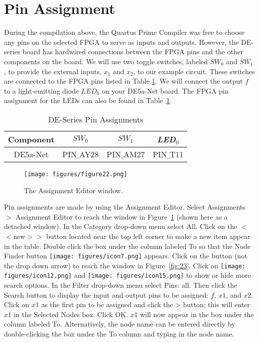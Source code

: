 \section{Pin Assignment}


During the compilation above, the Quartus Prime Compiler was free to choose any
pins on the selected FPGA to serve as inputs and outputs. However, the DE-series board
has hardwired connections between the FPGA pins and the other components on the board.
We will use two toggle switches, labeled $SW_0$ and $SW_1$, to provide the
external inputs, $x_1$ and $x_2$, to our example circuit. These switches are connected
to the FPGA pins listed in Table \ref{tab:pinassign}. We will connect the output $f$ to a
light-emitting diode $LED_0$ on your DE5a-Net board. 
The FPGA pin assignment for the LEDs can also be found in Table~\ref{tab:pinassign}.

\begin{table}[H]
\centering
\begin{tabular}{| c | c | c | c |}
\hline
Component & $SW_0$ & $SW_1$ & {\it LED}$_0$ \\
\hline
DE5a-Net & PIN$\_$AY28 & PIN$\_$AM27 & PIN$\_$T11 \\
\hline
\end{tabular}
 
\caption{DE-Series Pin Assignments}
\label{tab:pinassign}
\end{table}

\begin{figure}[H]
   \begin{center}
      \texttt{[image: figures/figure22.png]}
   \caption{The Assignment Editor window.} 
	 \label{fig:22}
	 \end{center}
\end{figure}

Pin assignments are made by using the Assignment Editor. 
Select {\sf Assignments $>$ Assignment Editor} to reach the window in Figure~\ref{fig:22}
(shown here as a detached window).
In the {\sf Category} drop-down menu select {\sf All}. Click on the {\sf $<$$<$new$>$$>$} button
located near the top left corner to make a new item appear in the table. Double click the box
under the column labeled To so that the Node Finder button \texttt{[image: figures/icon7.png]}
appears. Click on the button (not the drop down arrow) to reach the window in Figure~\ref{fig:23}. Click on \texttt{[image: figures/icon12.png]} and \texttt{[image: figures/icon15.png]} to show or hide more search options.
In the {\sf Filter} drop-down menu select {\sf Pins: all}. Then click the {\sf Search} button to display
the input and output pins to be assigned: $f$, $x1$, and $x2$.
Click on $x1$ as the first pin to be assigned and click the {\sf >} button; this will enter
$x1$ in the Selected Nodes box.  Click {\sf OK}. $x1$ will now appear in the box under the column
labeled To. Alternatively, the node name can be entered directly by double-clicking the box
under the To column and typing in the node name.

